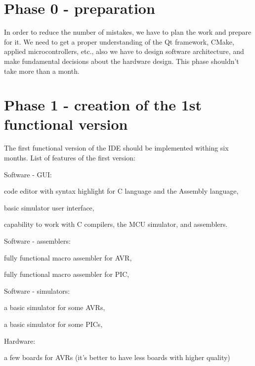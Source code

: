 \documentclass[a4paper,twoside,15pt]{book}
\begin{document}
    \section{Phase 0 - preparation}
        In order to reduce the number of mistakes, we have to plan the work and prepare for it. We need to get a proper understanding of the Qt framework, CMake, applied microcontrollers, etc., also we have to design software architecture, and make fundamental decisions about the hardware design. This phase shouldn't take more than a month.

    \section{Phase 1 - creation of the 1st functional version}
        The first functional version of the IDE should be implemented withing six months. List of features of the first version:
        \begin{dinglist}{73}
            \item Software - GUI:
                \begin{dinglist}{75}
                    \item code editor with syntax highlight for C language and the Assembly language,
                    \item basic simulator user interface,
                    \item capability to work with C compilers, the MCU simulator, and assemblers.
                \end{dinglist}
            \item Software - assemblers:
                \begin{dinglist}{75}
                    \item fully functional macro assembler for AVR,
                    \item fully functional macro assembler for PIC,
                \end{dinglist}
            \item Software - simulators:
                \begin{dinglist}{75}
                    \item a basic simulator for some AVRs,
                    \item a basic simulator for some PICs,
                \end{dinglist}
            \item Hardware:
                \begin{dinglist}{75}
                    \item a few boards for AVRs (it's better to have less boards with higher quality)
                \end{dinglist}
        \end{dinglist}
        
\end{document}
